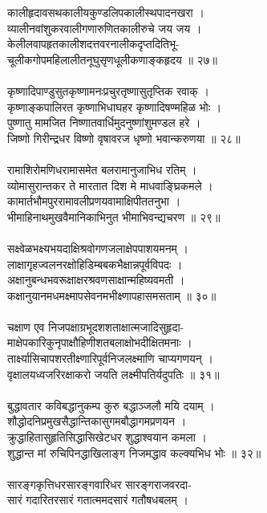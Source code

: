 कालीहृदावसथकालीयकुण्डलिपकालीस्थपादनखरा  ।\\
व्यालीनवांशुकरवालीगणारुणितकालीरुचे जय जय  ।\\
केलीलवापहृतकालीशदत्तवरनालीकदृप्तदितिभू-\\
चूलीकगोपमहिलालीतनूघुसृणधूलीकणाङ्कहृदय  ॥ २७॥\\
\\
कृष्णादिपाण्डुसुतकृष्णामनःप्रचुरतृष्णासुतृप्तिक रवाक्  ।\\
कृष्णाङ्कपालिरत कृष्णाभिधाघहर कृष्णादिषण्महिळ भोः  ।\\
पुष्णातु मामजित निष्णातवार्धिमुदनुष्णांशुमण्डल हरे  ।\\
जिष्णो गिरीन्द्रधर विष्णो वृषावरज धृष्णो भवान्करुणया  ॥ २८॥\\
\\
रामाशिरोमणिधरामासमेत बलरामानुजाभिध रतिम्  ।\\
व्योमासुरान्तकर ते मारतात दिश मे माधवाङ्घ्रिकमले  ।\\
कामार्तभौमपुररामावलीप्रणयवामाक्षिपीततनुभा  ।\\
भीमाहिनाथमुखवैमानिकाभिनुत भीमाभिवन्द्यचरण  ॥ २९॥\\
\\
सक्ष्वेळभक्ष्यभयदाक्षिश्रवोगणजलाक्षेपपाशयमनम्  ।\\
लाक्षागृहज्वलनरक्षोहिडिम्बबकभैक्षान्नपूर्वविपदः  ।\\
अक्षानुबन्धभवरूक्षाक्षरश्रवणसाक्षान्महिष्यवमती  ।\\
कक्षानुयानमधमक्ष्मापसेवनमभीक्ष्णापहासमसताम्  ॥ ३०॥\\
\\
चक्षाण एव निजपक्षाग्रभूदशशताक्षात्मजादिसुहृदा-\\
माक्षेपकारिकुनृपाक्षौहिणीशतबलाक्षोभदीक्षितमनाः  ।\\
तार्क्ष्यासिचापशरतीक्ष्णारिपूर्वनिजलक्ष्माणि चाप्यगणयन्  ।\\
वृक्षालयध्वजरिरक्षाकरो जयति लक्ष्मीपतिर्यदुपतिः  ॥ ३१॥\\
\\
बुद्धावतार कविबद्धानुकम्प कुरु बद्धाञ्जलौ मयि दयाम्  ।\\
शौद्धोदनिप्रमुखसैद्धान्तिकासुगमबौद्धागमप्रणयन  ।\\
क्रुद्धाहितासुहृतिसिद्धासिखेटधर शुद्धाश्वयान कमला  ।\\
शुद्धान्त मां रुचिपिनद्धाखिलाङ्ग निजमद्धाव कल्क्यभिध भोः  ॥ ३२॥\\
\\
सारङ्गकृत्तिधरसारङ्गवारिधर सारङ्गराजवरदा-\\
सारं गदारितरसारं गतात्ममदसारं गतौषधबलम्  ।\\
